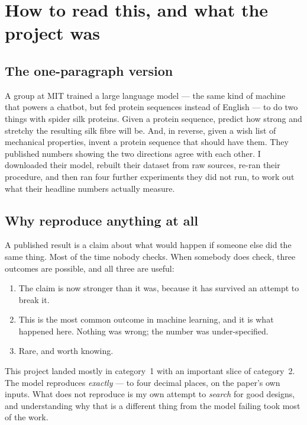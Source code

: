 \chapter{How to read this, and what the project was}

\section{The one-paragraph version}

A group at MIT trained a large language model --- the same kind of machine that
powers a chatbot, but fed protein sequences instead of English --- to do two
things with spider silk proteins. Given a protein sequence, predict how strong
and stretchy the resulting silk fibre will be. And, in reverse, given a wish
list of mechanical properties, invent a protein sequence that should have them.
They published numbers showing the two directions agree with each other. I
downloaded their model, rebuilt their dataset from raw sources, re-ran their
procedure, and then ran four further experiments they did not run, to work out
what their headline numbers actually measure.

\section{Why reproduce anything at all}

A published result is a claim about what would happen if someone else did the
same thing. Most of the time nobody checks. When somebody does check, three
outcomes are possible, and all three are useful:

\begin{enumerate}[leftmargin=*,itemsep=3pt]
  \item {} The claim is now stronger than it was, because it
        has survived an attempt to break it.
  \item {} This is the most common outcome in machine learning, and
        it is what happened here. Nothing was wrong; the number was
        under-specified.
  \item {} Rare, and worth knowing.
\end{enumerate}

This project landed mostly in category~1 with an important slice of
category~2. The model reproduces \emph{exactly} --- to four decimal places, on
the paper's own inputs. What does not reproduce is my own attempt to
\emph{search} for good designs, and understanding why that is a different thing
from the model failing took most of the work.


